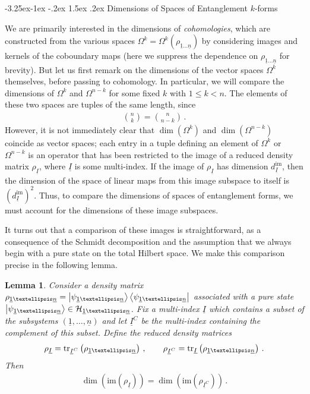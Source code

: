 \documentclass[12pt]{article}
\makeatletter
\newtheorem{lemma}{Lemma}[section]
\newcommand{\ul}[1]{{\underline{#1}}}
\newcommand{\im}{\mathrm{im}}
\renewcommand\subsection{\@startsection{subsection}{2}{\z@}%
                                     {-3.25ex\@plus -1ex \@minus -.2ex}%
                                     {1.5ex \@plus .2ex}%
                                     {\normalfont\bfseries}}
\numberwithin{equation}{section}
\newcommand{\Honeton}{{\mathcal{H}_{\ul{1} \ldots \ul{n}}}}
\newcommand{\rhooneton}{{\rho_{\ul{1} \ldots \ul{n}}}}
\newcommand{\psioneton}{{\psi_{\ul{1} \ldots \ul{n}}}}
\makeatother
\begin{document}
\subsection{Dimensions of Spaces of Entanglement $k$-forms}

We are primarily interested in the dimensions of \emph{cohomologies}, which are constructed from the various spaces $\Omega^k = \Omega^k ( \rhooneton )$ by considering images and kernels of the coboundary maps (here we suppress the dependence on $\rhooneton$ for brevity). But let us first remark on the dimensions of the vector spaces $\Omega^k$ themselves, before passing to cohomology. In particular, we will compare the dimensions of $\Omega^k$ and $\Omega^{n-k}$ for some fixed $k$ with $1 \leq k < n$. The elements of these two spaces are tuples of the same length, since
%
\begin{align}
    {n \choose k} = {n \choose n - k} \, .
\end{align}
%
However, it is not immediately clear that $\dim \left( \Omega^k \right)$ and $\dim \left( \Omega^{n-k} \right)$ coincide as vector spaces; each entry in a tuple defining an element of $\Omega^k$ or $\Omega^{n-k}$ is an operator that has been restricted to the image of a reduced density matrix $\rho_{\ul{I}}$, where $\ul{I}$ is some multi-index. If the image of $\rho_{\ul{I}}$ has dimension $d_{\ul{I}}^{\im}$, then the dimension of the space of linear maps from this image subspace to itself is $\left( d_{\ul{I}}^{\im} \right)^2$. Thus, to compare the dimensions of spaces of entanglement forms, we must account for the dimensions of these image subspaces.

It turns out that a comparison of these images is straightforward, as a consequence of the Schmidt decomposition and the assumption that we always begin with a pure state on the total Hilbert space. We make this comparison precise in the following lemma.

\begin{lemma}\label{dimensions_lemma}
    Consider a density matrix $\rhooneton = \ket{\psioneton} \bra{\psioneton}$ associated with a pure state $\ket{\psioneton} \in \Honeton$. Fix a multi-index $\ul{I}$ which contains a subset of the subsystems $(\ul{1}, \ldots, \ul{n})$ and let $\ul{I}^C$ be the multi-index containing the complement of this subset. Define the reduced density matrices
    \begin{align}
        \rho_{\ul{I}} = \tr_{\ul{I}^C} \left( \rhooneton \right) \, , \qquad \rho_{\ul{I}^C} = \tr_{\ul{I}} \left( \rhooneton \right) \, .
    \end{align}
    Then
    \begin{align}
        \dim \left( \im \left( \rho_{\ul{I}} \right) \right) = \dim \left( \im \left( \rho_{\ul{I}^C} \right) \right) \, .
    \end{align}
\end{lemma}
\end{document}
